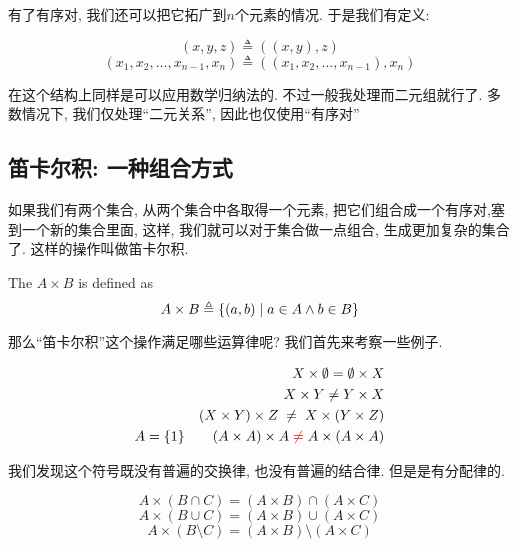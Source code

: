 有了有序对, 我们还可以把它拓广到$n$个元素的情况. 于是我们有定义: 

\begin{definition}
    \[
      (x, y, z) \triangleq ((x, y), z)
    \]
    \[
      (x_{1}, x_{2}, \dots, x_{n-1}, x_{n})
        \triangleq ((x_{1}, x_{2}, \dots, x_{n-1}), x_{n})
    \]
\end{definition}

在这个结构上同样是可以应用数学归纳法的. 不过一般我处理而二元组就行了. 多数情况下, 我们仅处理``二元关系'', 因此也仅使用``有序对''

\subsection{笛卡尔积: 一种组合方式}

如果我们有两个集合, 从两个集合中各取得一个元素, 把它们组合成一个有序对,塞到一个新的集合里面, 这样, 我们就可以对于集合做一点组合, 生成更加复杂的集合了. 这样的操作叫做笛卡尔积.  

\begin{definition}
    The  $A \times B$ 
    is defined as
    \[
      {A \times B \triangleq \{(a, b) \mid a \in A \land b \in B\}}
    \]
\end{definition}

那么``笛卡尔积''这个操作满足哪些运算律呢? 我们首先来考察一些例子. 

\begin{eg}
  
  \begin{align*}
  X\times \emptyset = \emptyset \times X \\
  X\times Y \neq  Y \times X \\
  (X \times Y) \times Z \;\neq\; X \times (Y \times Z)\\
  A = \{1\} \qquad (A \times A) \times A \;\textcolor{red}{\neq}\; A \times (A \times A)
  \end{align*}
  
\end{eg}

我们发现这个符号既没有普遍的交换律, 也没有普遍的结合律. 但是是有分配律的. 

\begin{theorem}
  \[
    A \times (B \cap C) = (A \times B) \cap (A \times C)
  \]
  \[
    A \times (B \cup C) = (A \times B) \cup (A \times C)
  \]
  \[
    A \times (B \setminus C) = (A \times B) \setminus (A \times C)
  \]
\end{theorem}

